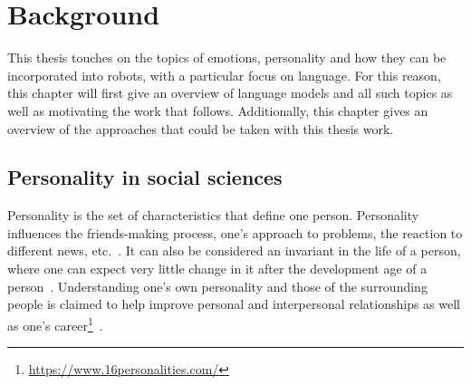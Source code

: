 \documentclass[nomenclature, english, biblatex]{kththesis}
\begin{document}
\cleardoublepage
\chapter{Background}
\label{ch:background}
This thesis touches on the topics of emotions, personality and how they can be incorporated into robots, with a particular focus on language. For this reason, this chapter will first give an overview of language models and all such topics as well as motivating the work that follows. Additionally, this chapter gives an overview of the approaches that could be taken with this thesis work.
\section{Personality in social sciences}
\label{sec:personality}
Personality is the set of characteristics that define one person. Personality influences the friends-making process, one's approach to problems, the reaction to different news, etc.~\cite{selfhout2010emerging, judge2007bright, neal2012predicting}. It can also be considered an invariant in the life of a person, where one can expect very little change in it after the development age of a person~\cite{shiner2003personality, halverson2014developing}. Understanding one's own personality and those of the surrounding people is claimed to help improve personal and interpersonal relationships as well as one's career\footnote{\url{https://www.16personalities.com/}}~\cite{holland2008big, judge2007bright, neal2012predicting}.
\end{document}
